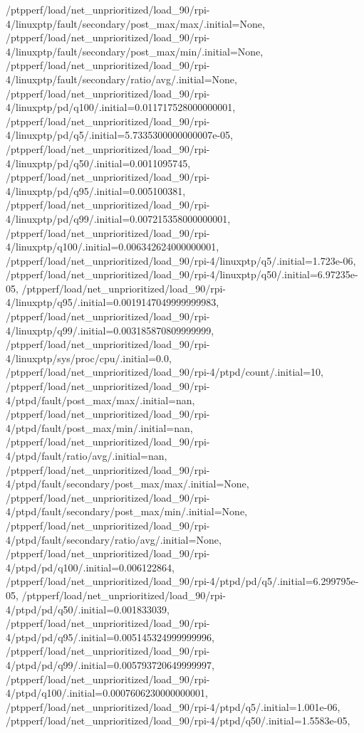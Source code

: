 {    /ptpperf/load/net_unprioritized/load_90/rpi-4/linuxptp/fault/secondary/post_max/max/.initial=None,
    /ptpperf/load/net_unprioritized/load_90/rpi-4/linuxptp/fault/secondary/post_max/min/.initial=None,
    /ptpperf/load/net_unprioritized/load_90/rpi-4/linuxptp/fault/secondary/ratio/avg/.initial=None,
    /ptpperf/load/net_unprioritized/load_90/rpi-4/linuxptp/pd/q100/.initial=0.011717528000000001,
    /ptpperf/load/net_unprioritized/load_90/rpi-4/linuxptp/pd/q5/.initial=5.7335300000000007e-05,
    /ptpperf/load/net_unprioritized/load_90/rpi-4/linuxptp/pd/q50/.initial=0.0011095745,
    /ptpperf/load/net_unprioritized/load_90/rpi-4/linuxptp/pd/q95/.initial=0.005100381,
    /ptpperf/load/net_unprioritized/load_90/rpi-4/linuxptp/pd/q99/.initial=0.007215358000000001,
    /ptpperf/load/net_unprioritized/load_90/rpi-4/linuxptp/q100/.initial=0.006342624000000001,
    /ptpperf/load/net_unprioritized/load_90/rpi-4/linuxptp/q5/.initial=1.723e-06,
    /ptpperf/load/net_unprioritized/load_90/rpi-4/linuxptp/q50/.initial=6.97235e-05,
    /ptpperf/load/net_unprioritized/load_90/rpi-4/linuxptp/q95/.initial=0.0019147049999999983,
    /ptpperf/load/net_unprioritized/load_90/rpi-4/linuxptp/q99/.initial=0.003185870809999999,
    /ptpperf/load/net_unprioritized/load_90/rpi-4/linuxptp/sys/proc/cpu/.initial=0.0,
    /ptpperf/load/net_unprioritized/load_90/rpi-4/ptpd/count/.initial=10,
    /ptpperf/load/net_unprioritized/load_90/rpi-4/ptpd/fault/post_max/max/.initial=nan,
    /ptpperf/load/net_unprioritized/load_90/rpi-4/ptpd/fault/post_max/min/.initial=nan,
    /ptpperf/load/net_unprioritized/load_90/rpi-4/ptpd/fault/ratio/avg/.initial=nan,
    /ptpperf/load/net_unprioritized/load_90/rpi-4/ptpd/fault/secondary/post_max/max/.initial=None,
    /ptpperf/load/net_unprioritized/load_90/rpi-4/ptpd/fault/secondary/post_max/min/.initial=None,
    /ptpperf/load/net_unprioritized/load_90/rpi-4/ptpd/fault/secondary/ratio/avg/.initial=None,
    /ptpperf/load/net_unprioritized/load_90/rpi-4/ptpd/pd/q100/.initial=0.006122864,
    /ptpperf/load/net_unprioritized/load_90/rpi-4/ptpd/pd/q5/.initial=6.299795e-05,
    /ptpperf/load/net_unprioritized/load_90/rpi-4/ptpd/pd/q50/.initial=0.001833039,
    /ptpperf/load/net_unprioritized/load_90/rpi-4/ptpd/pd/q95/.initial=0.005145324999999996,
    /ptpperf/load/net_unprioritized/load_90/rpi-4/ptpd/pd/q99/.initial=0.005793720649999997,
    /ptpperf/load/net_unprioritized/load_90/rpi-4/ptpd/q100/.initial=0.0007606230000000001,
    /ptpperf/load/net_unprioritized/load_90/rpi-4/ptpd/q5/.initial=1.001e-06,
    /ptpperf/load/net_unprioritized/load_90/rpi-4/ptpd/q50/.initial=1.5583e-05,
}
